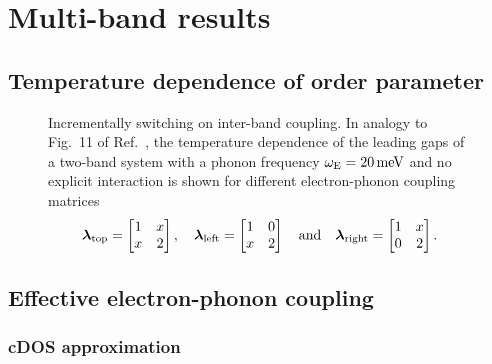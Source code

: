 
\chapter{Multi-band results}

\section{Temperature dependence of order parameter}

\begin{figure}
   \small
   
   
   
   \captionsetup{singlelinecheck=off}
   \caption[Incrementally switching on inter-band coupling]{
       Incrementally switching on inter-band coupling. In analogy to Fig.~11 of
       Ref.~, the temperature dependence of the
       leading  gaps of a two-band system with a phonon
       frequency $\omega \sb{\text{E}} = 20 \, \mathrm{meV}$ and no explicit
        interaction is shown for different electron-phonon
       coupling matrices
       \begin{equation*}
           \boldsymbol \lambda \sb{\text{top}} =
           \begin{bmatrix}
               1 & x \\
               x & 2
           \end{bmatrix},
           \quad
           \boldsymbol \lambda \sb{\text{left}} =
           \begin{bmatrix}
               1 & 0 \\
               x & 2
           \end{bmatrix}
           \quad \text{and} \quad
           \boldsymbol \lambda \sb{\text{right}} =
           \begin{bmatrix}
               1 & x \\
               0 & 2
           \end{bmatrix}.
       \end{equation*}
       }
\end{figure}

\section{Effective electron-phonon coupling}

\subsection{cDOS approximation}

